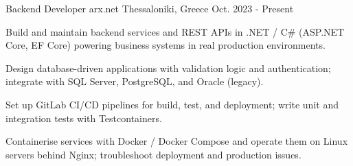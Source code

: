 

\begin{cventries}

  \cventry%
    {Backend Developer} %
    {arx.net} %
    {Thessaloniki, Greece} %
    {Oct. 2023 - Present} %
    {
      \begin{cvitems} %
        \item {Build and maintain backend services and REST APIs in .NET / C\# (ASP.NET Core, EF Core) powering business systems in real production environments.}
        \item {Design database-driven applications with validation logic and authentication; integrate with SQL Server, PostgreSQL, and Oracle (legacy).}
        \item {Set up GitLab CI/CD pipelines for build, test, and deployment; write unit and integration tests with Testcontainers.}
        \item {Containerise services with Docker / Docker Compose and operate them on Linux servers behind Nginx; troubleshoot deployment and production issues.}
      \end{cvitems}
    }

\end{cventries}
